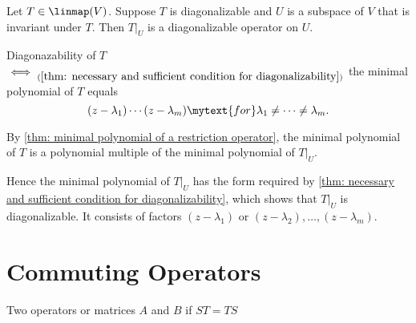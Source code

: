 \setcounter{thm}{64}
\begin{thm}
  \label{thm: restriction of diagonalizable operator to invariant subspace}
  Let $T\in \linmap(V)$. Suppose $T$ is diagonalizable and $U$ is a subspace of $V$ that is invariant under $T$.
  Then $\left.T\right|_U$ is a diagonalizable operator on $U$.
\end{thm}
\begin{prf}
  Diagonazability of $T$ $\iff_{(\ref{thm: necessary and sufficient condition for diagonalizability})}$ the minimal polynomial of $T$ equals
  \begin{equation}
    (z-\lambda_1)\cdots(z-\lambda_m) \mytext{for} \lambda_1 \neq \cdots \neq \lambda_m.
  \end{equation}

  By \ref{thm: minimal polynomial of a restriction operator}, the minimal polynomial of $T$ is a polynomial multiple of the minimal polynomial of $\left.T\right|_U$.

  Hence the minimal polynomial of $\left.T\right|_U$  has the form required by \ref{thm: necessary and sufficient condition for diagonalizability}, which shows that $\left.T\right|_U$ is diagonalizable. It consists of factors $(z-\lambda_1)$ or $(z-\lambda_2), \dots, (z-\lambda_m)$.
\end{prf}


\section{Commuting Operators}
\begin{mydef}
  Two operators or matrices $A$ and $B$   if $ST=TS$
\end{mydef}